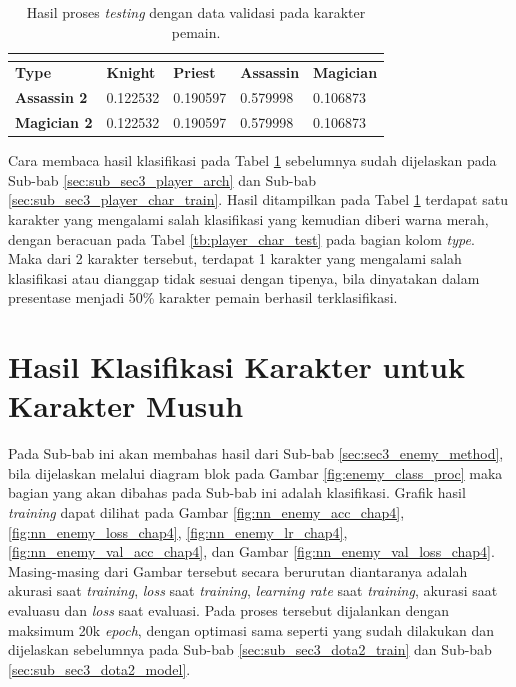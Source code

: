 \begin{longtable}{|l|l|l|l|l|}
	\caption{Hasil proses \textit{testing} dengan data validasi pada karakter pemain.}
	\vspace{1ex}
	\label{tb:player_valid_result}\\
	\hline
	\rowcolor[HTML]{C0C0C0} 
	\textbf{Type} & \textbf{Knight} & \textbf{Priest} & \textbf{Assassin} & \textbf{Magician} \\ \hline
	\textbf{Assassin 2} & 0.122532 & 0.190597 & {\color[HTML]{009901} 0.579998} & 0.106873 \\ \hline
	\textbf{Magician 2} & 0.122532 & 0.190597 & {\color[HTML]{FE0000} 0.579998} & 0.106873 \\ \hline
\end{longtable}
\vspace{1ex}

Cara membaca hasil klasifikasi pada Tabel \ref{tb:player_valid_result} sebelumnya sudah dijelaskan pada Sub-bab \ref{sec:sub_sec3_player_arch} dan Sub-bab \ref{sec:sub_sec3_player_char_train}. Hasil ditampilkan pada Tabel \ref{tb:player_valid_result} terdapat satu karakter yang mengalami salah klasifikasi yang kemudian diberi warna merah, dengan beracuan pada Tabel \ref{tb:player_char_test} pada bagian kolom \textit{type}. Maka dari 2 karakter tersebut, terdapat 1 karakter yang mengalami salah klasifikasi atau dianggap tidak sesuai dengan tipenya, bila dinyatakan dalam presentase menjadi 50\% karakter pemain berhasil terklasifikasi.
\vspace{1ex}

\section{Hasil Klasifikasi Karakter untuk Karakter Musuh}
\label{sec:sec4_eval_enemy}
\vspace{1ex}

Pada Sub-bab ini akan membahas hasil dari Sub-bab \ref{sec:sec3_enemy_method}, bila dijelaskan melalui diagram blok pada Gambar \ref{fig:enemy_class_proc} maka bagian yang akan dibahas pada Sub-bab ini adalah klasifikasi. Grafik hasil \textit{training} dapat dilihat pada Gambar \ref{fig:nn_enemy_acc_chap4}, \ref{fig:nn_enemy_loss_chap4}, \ref{fig:nn_enemy_lr_chap4}, \ref{fig:nn_enemy_val_acc_chap4}, dan Gambar \ref{fig:nn_enemy_val_loss_chap4}. Masing-masing dari Gambar tersebut secara berurutan diantaranya adalah akurasi saat \textit{training}, \textit{loss} saat \textit{training}, \textit{learning rate} saat \textit{training}, akurasi saat evaluasu dan \textit{loss} saat evaluasi. Pada proses tersebut dijalankan dengan maksimum 20k \textit{epoch}, dengan optimasi sama seperti yang sudah dilakukan dan dijelaskan sebelumnya pada Sub-bab \ref{sec:sub_sec3_dota2_train} dan Sub-bab \ref{sec:sub_sec3_dota2_model}.
\vspace{1ex}

